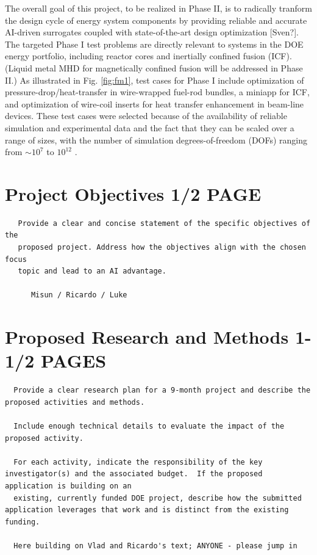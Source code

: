The overall goal of this project, to be realized in Phase II, is to radically
tranform the design cycle of energy system components by providing reliable and
accurate AI-driven surrogates coupled with state-of-the-art design optimization
[Sven?].  The targeted Phase I test problems are directly relevant to systems
in the DOE energy portfolio, including reactor cores and inertially confined
fusion (ICF).  (Liquid metal MHD for magnetically confined fusion will be
addressed in Phase II.) As illustrated in Fig. \ref{fig:fm1}, test cases for
Phase I include optimization of pressure-drop/heat-transfer in wire-wrapped
fuel-rod bundles, a miniapp for ICF, and optimization of wire-coil inserts for
heat transfer enhancement in beam-line devices.   These test cases were
selected because of the availability of reliable simulation and experimental
data and the fact that they can be scaled over a range of sizes, with the
number of simulation degrees-of-freedom (DOFs) ranging from $\sim 10^7$ to
$10^{12}$ \cite{gb23,gb25mfem}.

\newpage
\section{    Project Objectives \hspace{1.0in} 1/2 PAGE}

\tiny \small \begin{verbatim}
   Provide a clear and concise statement of the specific objectives of the
   proposed project. Address how the objectives align with the chosen focus
   topic and lead to an AI advantage.

      Misun / Ricardo / Luke
\end{verbatim}
\normalsize

\newpage
\section{    Proposed Research and Methods \hspace{1.0in} 1-1/2 PAGES}

\tiny \begin{verbatim}
  Provide a clear research plan for a 9-month project and describe the proposed activities and methods.

  Include enough technical details to evaluate the impact of the proposed activity.

  For each activity, indicate the responsibility of the key investigator(s) and the associated budget.  If the proposed application is building on an
  existing, currently funded DOE project, describe how the submitted application leverages that work and is distinct from the existing funding.

  Here building on Vlad and Ricardo's text; ANYONE - please jump in
\end{verbatim}
\normalsize


